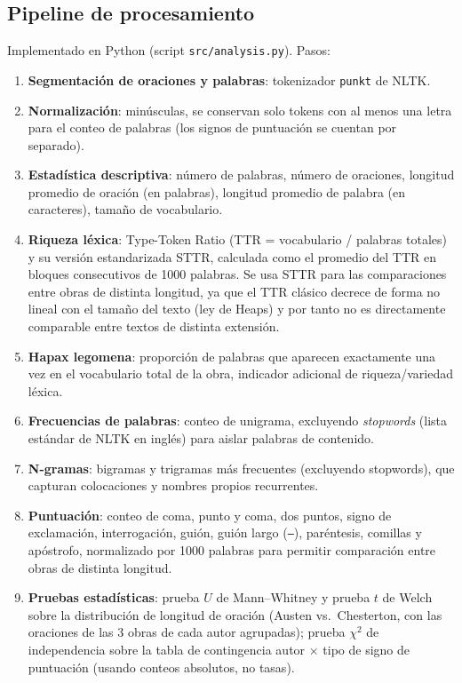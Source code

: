 \documentclass[11pt]{article}
\begin{document}
\subsection{Pipeline de procesamiento}
Implementado en Python (script \texttt{src/analysis.py}). Pasos:

\begin{enumerate}
    \item \textbf{Segmentación de oraciones y palabras}: tokenizador \texttt{punkt} de NLTK.
    \item \textbf{Normalización}: minúsculas, se conservan solo tokens con al menos una letra para el conteo de palabras (los signos de puntuación se cuentan por separado).
    \item \textbf{Estadística descriptiva}: número de palabras, número de oraciones, longitud promedio de oración (en palabras), longitud promedio de palabra (en caracteres), tamaño de vocabulario.
    \item \textbf{Riqueza léxica}: Type-Token Ratio (TTR = vocabulario / palabras totales) y su versión estandarizada STTR, calculada como el promedio del TTR en bloques consecutivos de 1000 palabras. Se usa STTR para las comparaciones entre obras de distinta longitud, ya que el TTR clásico decrece de forma no lineal con el tamaño del texto (ley de Heaps) y por tanto no es directamente comparable entre textos de distinta extensión.
    \item \textbf{Hapax legomena}: proporción de palabras que aparecen exactamente una vez en el vocabulario total de la obra, indicador adicional de riqueza/variedad léxica.
    \item \textbf{Frecuencias de palabras}: conteo de unigrama, excluyendo \emph{stopwords} (lista estándar de NLTK en inglés) para aislar palabras de contenido.
    \item \textbf{N-gramas}: bigramas y trigramas más frecuentes (excluyendo stopwords), que capturan colocaciones y nombres propios recurrentes.
    \item \textbf{Puntuación}: conteo de coma, punto y coma, dos puntos, signo de exclamación, interrogación, guión, guión largo (\texttt{--}), paréntesis, comillas y apóstrofo, normalizado por 1000 palabras para permitir comparación entre obras de distinta longitud.
    \item \textbf{Pruebas estadísticas}: prueba $U$ de Mann--Whitney y prueba $t$ de Welch sobre la distribución de longitud de oración (Austen vs.\ Chesterton, con las oraciones de las 3 obras de cada autor agrupadas); prueba $\chi^2$ de independencia sobre la tabla de contingencia autor $\times$ tipo de signo de puntuación (usando conteos absolutos, no tasas).
\end{enumerate}
\end{document}
